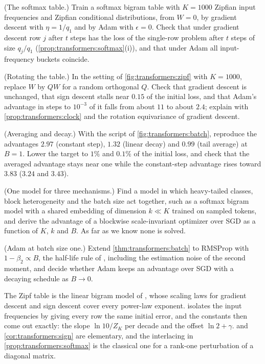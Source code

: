 \begin{refsection}
\begin{exercises}
\item \simulation (The softmax table.) Train a softmax bigram table with $K=1000$ Zipfian input frequencies and Zipfian conditional distributions, from $W=0$, by gradient descent with $\eta=1/q_1$ and by Adam with $\epsilon=0$. Check that under gradient descent row $j$ after $t$ steps has the loss of the single-row problem after $t$ steps of size $q_j/q_1$ (\cref{prop:transformers:softmax}(i)), and that under Adam all input-frequency buckets coincide.\label{ex:transformers:simsoftmax}

\item \simulation (Rotating the table.) In the setting of \cref{fig:transformers:zipf} with $K=1000$, replace $W$ by $QW$ for a random orthogonal $Q$. Check that gradient descent is unchanged, that sign descent stalls near $0.15$ of the initial loss, and that Adam's advantage in steps to $10^{-3}$ of it falls from about $11$ to about $2.4$; explain with \cref{prop:transformers:clock} and the rotation equivariance of gradient descent.\label{ex:transformers:rotation}

\item \simulation (Averaging and decay.) With the script of \cref{fig:transformers:batch}, reproduce the advantages $2.97$ (constant step), $1.32$ (linear decay) and $0.99$ (tail average) at $B=1$. Lower the target to $1\%$ and $0.1\%$ of the initial loss, and check that the averaged advantage stays near one while the constant-step advantage rises toward $3.83$ ($3.24$ and $3.43$).\label{ex:transformers:simavg}

\item \research (One model for three mechanisms.) Find a model in which heavy-tailed classes, block heterogeneity and the batch size act together, such as a softmax bigram model with a shared embedding of dimension $k\ll K$ trained on sampled tokens, and derive the advantage of a blockwise scale-invariant optimizer over SGD as a function of $K$, $k$ and $B$. As far as we know none is solved.\label{ex:transformers:unified}

\item \research (Adam at batch size one.) Extend \cref{thm:transformers:batch} to RMSProp with $1-\beta_2\propto B$, the half-life rule of \textcite{MarekEtAl2025}, including the estimation noise of the second moment, and decide whether Adam keeps an advantage over SGD with a decaying schedule as $B\to0$.\label{ex:transformers:adambs}
\end{exercises}

\notesandrefs
The Zipf table is the linear bigram model of \textcite{KunstnerBach2025}, whose scaling laws for gradient descent and sign descent cover every power-law exponent.  isolates the input frequencies by giving every row the same initial error, and the constants then come out exactly: the slope $\ln10/Z_K$ per decade and the offset $\ln2+\gamma$.  and \cref{cor:transformers:sign} are elementary, and the interlacing in \cref{prop:transformers:softmax} is the classical one for a rank-one perturbation of a diagonal matrix.


\end{refsection}
